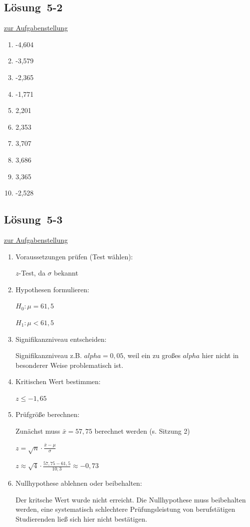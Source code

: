 \documentclass[
  11pt,
  ngerman,
  a4paper,
]{report}
\providecommand{\tightlist}{%
  \setlength{\itemsep}{0pt}\setlength{\parskip}{0pt}}
\begin{document}
\hypertarget{loesung-5-2}{%
\subsection{Lösung~5-2}\label{loesung-5-2}}

\protect\hyperlink{aufgabe-5-2}{zur Aufgabenstellung}

\begin{enumerate}
\def\labelenumi{\alph{enumi})}
\tightlist
\item
  -4,604
\item
  -3,579
\item
  -2,365
\item
  -1,771
\item
  2,201
\item
  2,353
\item
  3,707
\item
  3,686
\item
  3,365
\item
  -2,528
\end{enumerate}

\hypertarget{loesung-5-3}{%
\subsection{Lösung~5-3}\label{loesung-5-3}}

\protect\hyperlink{aufgabe-5-3}{zur Aufgabenstellung}

\begin{enumerate}
\def\labelenumi{\arabic{enumi}.}
\item
  Voraussetzungen prüfen (Test wählen):

  \(z\)-Test, da \(\sigma\) bekannt
\item
  Hypothesen formulieren:

  \(H_0 : \mu = 61{,}5\)

  \(H_1 : \mu < 61{,}5\)
\item
  Signifikanzniveau entscheiden:

  Signifikanzniveau z.B. \(alpha=0,05\), weil ein zu großes \(alpha\) hier nicht in besonderer Weise problematisch ist.
\item
  Kritischen Wert bestimmen:

  \(z \leq -1{,}65\)
\item
  Prüfgröße berechnen:

  Zunächst muss \(\bar{x} = 57{,}75\) berechnet werden (s. Sitzung 2)

  \(z=\sqrt{n}\cdot\frac{\bar{x}-\mu}{\sigma}\)

  \(z\approx\sqrt{4}\cdot\frac{57{,}75-61{,}5}{10{,}3}\approx-0{,}73\)
\item
  Nullhypothese ablehnen oder beibehalten:

  Der kritsche Wert wurde nicht erreicht. Die Nullhypothese muss beibehalten werden, eine systematisch schlechtere Prüfungsleistung von berufstätigen Studierenden ließ sich hier nicht bestätigen.
\end{enumerate}
\end{document}
